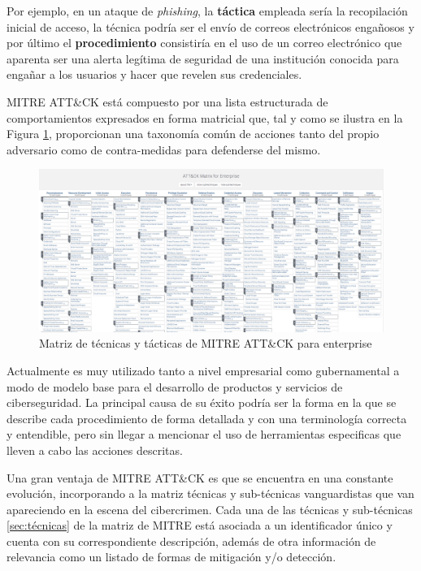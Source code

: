 \vspace{-1mm}

Por ejemplo, en un ataque de \textit{phishing}, la \textbf{táctica} empleada sería la recopilación inicial de acceso, la técnica podría ser el envío de correos electrónicos engañosos y por último el \textbf{procedimiento} consistiría en el uso de un correo electrónico que aparenta ser una alerta legítima de seguridad de una institución conocida para engañar a los usuarios y hacer que revelen sus credenciales.

MITRE \gls{ATT&CK} está compuesto por una lista estructurada de comportamientos expresados en forma matricial que, tal y como se ilustra en la Figura \ref{fig:mitre-matrix}, proporcionan una taxonomía común de acciones tanto del propio adversario como de contra-medidas para defenderse del mismo.

\vspace{-1mm}

\begin{figure}[H]
    \centering
    \includegraphics[width=\textwidth]{imagenes/mitre-matrix.png}
    \caption{Matriz de técnicas y tácticas de MITRE ATT\&CK para enterprise \cite{mitre_attack}}
    \label{fig:mitre-matrix}
\end{figure}

\vspace{-2.5mm}

Actualmente es muy utilizado tanto a nivel empresarial como gubernamental a modo de modelo base para el desarrollo de productos y servicios de ciberseguridad. La principal causa de su éxito podría ser la forma en la que se describe cada procedimiento de forma detallada y con una terminología correcta y entendible, pero sin llegar a mencionar el uso de herramientas especificas que lleven a cabo las acciones descritas. 

\newpage

Una gran ventaja de MITRE ATT\&CK \cite{mitre_attack} es que se encuentra en una constante evolución, incorporando a la matriz técnicas y sub-técnicas vanguardistas que van apareciendo en la escena del cibercrimen. Cada una de las técnicas y sub-técnicas \ref{sec:técnicas} de la matriz de MITRE está asociada a un identificador único y cuenta con su correspondiente descripción, además de otra información de relevancia como un listado de formas de mitigación y/o detección. 


